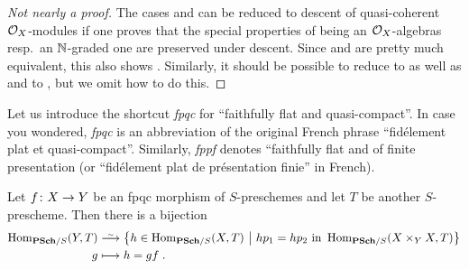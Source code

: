 \documentclass[a4paper,parskip=half,numbers=enddot, DIV=12]{scrreprt}
\begin{document}
\begin{proof}[Not nearly a proof]
	The cases  and  can be reduced to descent of quasi-coherent $\mathcal{O}_X$-modules if one proves that the special properties of being an $\mathcal{O}_X$-algebras resp.\ an $\mathbb{N}$-graded one are preserved under descent. Since  and  are pretty much equivalent, this also shows . Similarly, it should be possible to reduce  to  as well as  and  to , but we omit how to do this.
\end{proof}
Let us introduce the shortcut \emph{fpqc} for ``faithfully flat and quasi-compact''. In case you wondered, \emph{fpqc} is an abbreviation of the original French phrase ``fidélement plat et quasi-compact''. Similarly, \emph{fppf} denotes ``faithfully flat and of finite presentation (or ``fidélement plat de présentation finie'' in French).
\begin{cor}
	Let $f\colon X\morphism Y$ be an fpqc morphism of $S$-preschemes and let $T$ be another $S$-prescheme. Then there is a bijection
	\begin{align*}
		\Hom_{\cat{PSch}/S}(Y,T)&\isomorphism \left\{h\in\Hom_{\cat{PSch}/S}(X,T)\st h p_1=h p_2\text{ in }\Hom_{\cat{PSch}/S}(X\times_YX,T)\right\}\\
		g&\longmapsto h=gf\;.
	\end{align*}
\end{cor}
\end{document}
